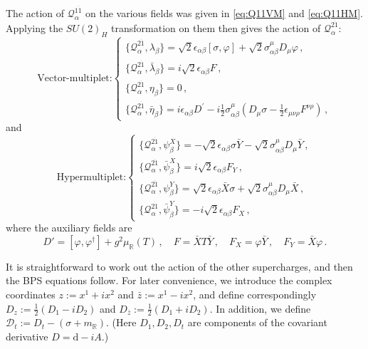 \documentclass[12pt,a4paper]{article}
\renewcommand{\(}{\left(}
\renewcommand{\)}{\right)}
\renewcommand{\(}{\left(}
\renewcommand{\)}{\right)}
\begin{document}
The action of $\mathcal{Q}^{1\dot{1}}_\alpha$ on the various fields was given in \eqref{eq:Q11VM} and \eqref{eq:Q11HM}. 
Applying the $SU(2)_H$ transformation on them then gives the action of $\mathcal{Q}^{2\dot{1}}_\alpha$:
\begin{equation}\label{eq:Q21VM}
\text{Vector-multiplet:}\left\{
\begin{array}{l}
\{\mathcal{Q}^{2\dot{1}}_\alpha,\lambda_\beta\} =\sqrt{2}\epsilon_{\alpha\beta}[\sigma,\varphi]+\sqrt{2}\sigma^\mu_{\alpha\beta}D_\mu\varphi\,,   \\
\{\mathcal{Q}^{2\dot{1}}_\alpha,\bar{\lambda}_\beta\}=i\sqrt{2}\epsilon_{\alpha\beta}F\,,\\
\{\mathcal{Q}^{2\dot{1}}_\alpha,\eta_\beta\}=0\,,\\
\{\mathcal{Q}^{2\dot{1}}_\alpha,\bar{\eta}_\beta\}=i\epsilon_{\alpha\beta}D^{'}-i\frac{1}{2}\sigma^{\mu}_{\alpha\beta}(D_\mu\sigma-\frac{1}{2}\epsilon_{\mu\nu\rho}F^{\nu\rho})\,,
\end{array}
\right.
\end{equation}
and
\begin{equation}\label{eq:Q21HM}
\text{Hypermultiplet:}\left\{
\begin{array}{l}
\{\mathcal{Q}^{2\dot{1}}_\alpha,\psi^X_\beta\}=-\sqrt{2}\epsilon_{\alpha\beta}\sigma \bar{Y}-\sqrt{2}\sigma^\mu_{\alpha\beta}D_\mu \bar{Y}\,,\\
\{\mathcal{Q}^{2\dot{1}}_\alpha,\bar{\psi}^X_\beta\}=i\sqrt{2}\epsilon_{\alpha\beta}F_Y\,,\\
\{\mathcal{Q}^{2\dot{1}}_\alpha,\psi^Y_\beta\}=\sqrt{2}\epsilon_{\alpha\beta}\bar{X}\sigma +\sqrt{2}\sigma^\mu_{\alpha\beta}D_\mu \bar{X}\,,\\
\{\mathcal{Q}^{2\dot{1}}_\alpha,\bar{\psi}^Y_\beta\}=-i\sqrt{2}\epsilon_{\alpha\beta}F_X\,,
\end{array}\right.
\end{equation}
where the auxiliary fields are
\begin{equation}
D'=[\varphi,\varphi^\dag]+g^2\mu_{\mathbb{R}}(T)\,,\quad F=\bar{X}T\bar{Y}\,,\quad F_X=\varphi \bar{Y}\,,\quad F_Y=\bar{X}\varphi\,.
\end{equation}

\medskip


It is straightforward to work out the action of the other supercharges, and then the BPS equations follow. 
For later convenience, we introduce the complex coordinates $z:=x^1+ix^2$ and $\bar{z}:=x^1-ix^2$, and define correspondingly $D_z:=\frac{1}{2}(D_1-iD_2)$ and $D_{\bar{z}}:=\frac{1}{2}(D_1+iD_2)$.
In addition, we define $
\mathcal{D}_t:=D_t-(\sigma+m_{\mathbb{R}})$.
(Here $D_1,D_2,D_t$ are components of the covariant derivative $D=\mathrm{d}-iA$.) 
\end{document}
